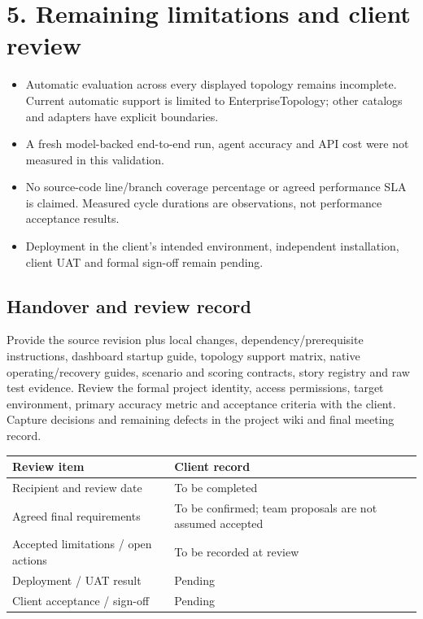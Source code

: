 \documentclass[10pt,a4paper]{article}
\begin{document}
\section*{5. Remaining limitations and client review}
\begin{itemize}
\item Automatic evaluation across every displayed topology remains incomplete. Current automatic support is limited to EnterpriseTopology; other catalogs and adapters have explicit boundaries.
\item A fresh model-backed end-to-end run, agent accuracy and API cost were not measured in this validation.
\item No source-code line/branch coverage percentage or agreed performance SLA is claimed. Measured cycle durations are observations, not performance acceptance results.
\item Deployment in the client's intended environment, independent installation, client UAT and formal sign-off remain pending.
\end{itemize}

\subsection*{Handover and review record}
Provide the source revision plus local changes, dependency/prerequisite instructions, dashboard startup guide, topology support matrix, native operating/recovery guides, scenario and scoring contracts, story registry and raw test evidence. Review the formal project identity, access permissions, target environment, primary accuracy metric and acceptance criteria with the client. Capture decisions and remaining defects in the project wiki and final meeting record.

\begin{tabularx}{\textwidth}{@{}lX@{}}\toprule
Review item & Client record \\
\midrule
Recipient and review date & To be completed \\
Agreed final requirements & To be confirmed; team proposals are not assumed accepted \\
Accepted limitations / open actions & To be recorded at review \\
Deployment / UAT result & Pending \\
Client acceptance / sign-off & Pending \\
\bottomrule\end{tabularx}
\end{document}
